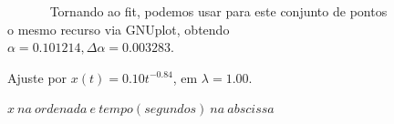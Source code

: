 \documentclass[pdftex,12pt,a4paper]{article}
\begin{document}
\begin{figure}
~~~~~~ Tornando ao fit, podemos usar para este conjunto de pontos o mesmo recurso via GNUplot, obtendo $\alpha = 0.101214, \Delta \alpha = 0.003283$.

\centering
\caption{Ajuste por $x(t) = 0.10t^{-0.84}$, em $\lambda = 1.00$.}
\caption*{$x\ na\ ordenada\ e\ tempo(segundos)\ na\ abscissa$}
\end{figure}
\end{document}
